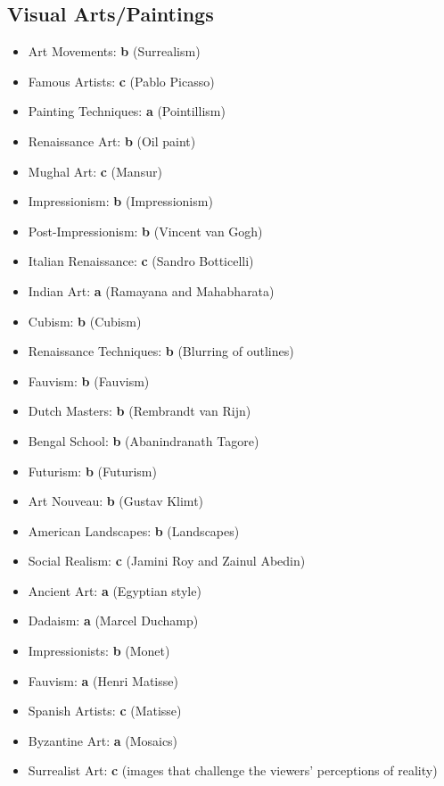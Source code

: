 \documentclass[12pt,a4paper]{book}
\begin{document}
\subsection{Visual Arts/Paintings}
\begin{itemize}
\item Art Movements: \textbf{b} (Surrealism)
\item Famous Artists: \textbf{c} (Pablo Picasso)
\item Painting Techniques: \textbf{a} (Pointillism)
\item Renaissance Art: \textbf{b} (Oil paint)
\item Mughal Art: \textbf{c} (Mansur)
\item Impressionism: \textbf{b} (Impressionism)
\item Post-Impressionism: \textbf{b} (Vincent van Gogh)
\item Italian Renaissance: \textbf{c} (Sandro Botticelli)
\item Indian Art: \textbf{a} (Ramayana and Mahabharata)
\item Cubism: \textbf{b} (Cubism)
\item Renaissance Techniques: \textbf{b} (Blurring of outlines)
\item Fauvism: \textbf{b} (Fauvism)
\item Dutch Masters: \textbf{b} (Rembrandt van Rijn)
\item Bengal School: \textbf{b} (Abanindranath Tagore)
\item Futurism: \textbf{b} (Futurism)
\item Art Nouveau: \textbf{b} (Gustav Klimt)
\item American Landscapes: \textbf{b} (Landscapes)
\item Social Realism: \textbf{c} (Jamini Roy and Zainul Abedin)
\item Ancient Art: \textbf{a} (Egyptian style)
\item Dadaism: \textbf{a} (Marcel Duchamp)
\item Impressionists: \textbf{b} (Monet)
\item Fauvism: \textbf{a} (Henri Matisse)
\item Spanish Artists: \textbf{c} (Matisse)
\item Byzantine Art: \textbf{a} (Mosaics)
\item Surrealist Art: \textbf{c} (images that challenge the viewers' perceptions of reality)
\end{itemize}
\end{document}
